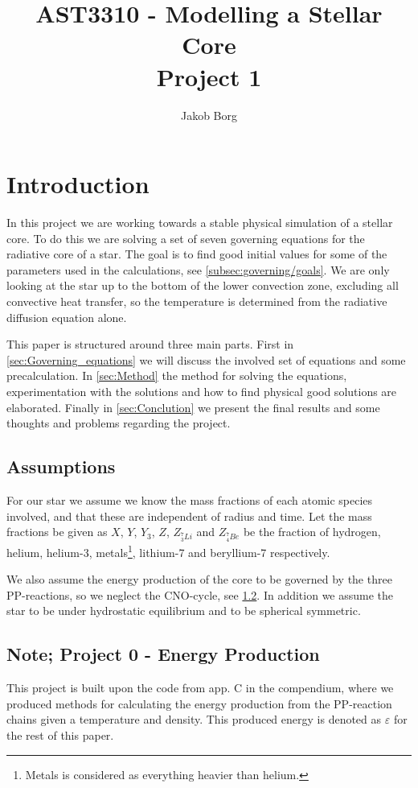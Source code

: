 \documentclass[11pt,a4paper,twocolumn,titlepage]{article}
\title{AST3310 - Modelling a Stellar Core\\ 
        \vspace{15mm}Project 1}
\author{Jakob Borg}
\begin{document}

\maketitle


\section{Introduction} \label{sec:Introduction}
In this project we are working towards a stable physical simulation of a stellar core. To do this we are solving a set of seven governing equations for the radiative core of a star. The goal is to find good initial values for some of the parameters used in the calculations, see \cref{subsec:governing/goals}. We are only looking at the star up to the bottom of the lower convection zone, excluding all convective heat transfer, so the temperature is determined from the radiative diffusion equation alone.

This paper is structured around three main parts. First in \cref{sec:Governing_equations} we will discuss the involved set of equations and some precalculation. In \cref{sec:Method} the method for solving the equations, experimentation with the solutions and how to find physical good solutions are elaborated. Finally in \cref{sec:Conclution} we present the final results and some thoughts and problems regarding the project.

\subsection{Assumptions}\label{subsec:Intro/Assumptions}
For our star we assume we know the mass fractions of each atomic species involved, and that these are independent of radius and time. Let the mass fractions be given as $X$, $Y$, $Y_3$, $Z$, $Z_{^7_3Li}$ and $Z_{^7_4Be}$ be the fraction of hydrogen, helium, helium-3, metals\footnote{Metals is considered as everything heavier than helium.}, lithium-7 and beryllium-7 respectively.

We also assume the energy production of the core to be governed by the three PP-reactions, so we neglect the CNO-cycle, see \cref{subsec:Intro/project0}. In addition we assume the star to be under hydrostatic equilibrium and to be spherical symmetric.

\subsection{Note; Project 0 - Energy Production} \label{subsec:Intro/project0}
This project is built upon the code from app. C in the compendium, where we produced methods for calculating the energy production from the PP-reaction chains given a temperature and density. This produced energy is denoted as $\varepsilon$ for the rest of this paper.
\end{document}
